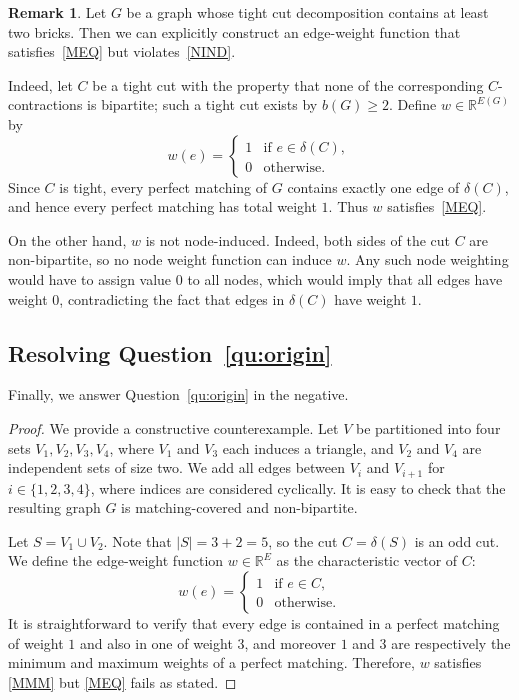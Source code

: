 \documentclass{article}
\theoremstyle{plain}
\theoremstyle{definition}
\newtheorem{rem}[thm]{Remark}
\begin{document}
\begin{rem}
    Let $G$ be a graph whose tight cut decomposition contains at least two bricks. Then we can explicitly construct an edge-weight function that satisfies~\ref{MEQ} but violates~\ref{NIND}.
    
    Indeed, let $C$ be a tight cut with the property that none of the corresponding $C$-contractions is bipartite; such a tight cut exists by $b(G)\geq 2$. Define $w \in \mathbb{R}^{E(G)}$ by
    \begin{equation*}
    w(e) =
    \begin{cases}
        1 & \text{if } e \in \delta(C), \\
        0 & \text{otherwise.}
    \end{cases}
    \end{equation*}
    Since $C$ is tight, every perfect matching of $G$ contains exactly one edge of $\delta(C)$, and hence every perfect matching has total weight $1$. Thus $w$ satisfies~\ref{MEQ}.
    
    On the other hand, $w$ is not node-induced. Indeed, both sides of the cut $C$ are non-bipartite, so no node weight function can induce $w$. Any such node weighting would have to assign value $0$ to all nodes, which would imply that all edges have weight $0$, contradicting the fact that edges in $\delta(C)$ have weight $1$.
\end{rem}


\subsection{Resolving Question~\ref{qu:origin}}
\label{sec:negative}

Finally, we answer Question~\ref{qu:origin} in the negative.

\thmmainfourth*

\begin{proof}
    We provide a constructive counterexample. Let $V$ be partitioned into four sets $V_1, V_2, V_3, V_4$, where $V_1$ and $V_3$ each induces a triangle, and $V_2$ and $V_4$ are independent sets of size two. We add all edges between $V_i$ and $V_{i+1}$ for $i \in \{1, 2, 3, 4\}$, where indices are considered cyclically. It is easy to check that the resulting graph $G$ is matching-covered and non-bipartite.

    Let $S = V_1 \cup V_2$. Note that $|S| = 3 + 2 = 5$, so the cut $C = \delta(S)$ is an odd cut. We define the edge-weight function $w \in \mathbb{R}^E$ as the characteristic vector of $C$:
    \begin{equation*}
    w(e) = 
    \begin{cases}
        1 & \text{if $e \in C$}, \\
        0 & \text{otherwise}. 
    \end{cases}
    \end{equation*}
    It is straightforward to verify that every edge is contained in a perfect matching of weight $1$ and also in one of weight $3$, and moreover $1$ and $3$ are respectively the minimum and maximum weights of a perfect matching. Therefore, $w$ satisfies \ref{MMM} but \ref{MEQ} fails as stated.  
\end{proof}
\end{document}
